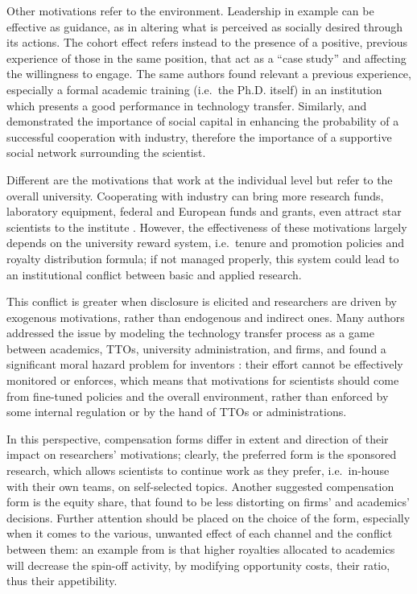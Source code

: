 Other motivations refer to the environment. Leadership in example can be effective as guidance, as in altering what is perceived as socially desired through its actions. The cohort effect \citep{Bercovitz2006} refers instead to the presence of a positive, previous experience of those in the same position, that act as a \enquote{case study} and affecting the willingness to engage. The same authors found relevant a previous experience, especially a formal academic training (i.e.\ the Ph.D. itself) in an institution which presents a good performance in technology transfer. Similarly, \citet{Murray2004} and \citet{Link2007} demonstrated the importance of social capital in enhancing the probability of a successful cooperation with industry, therefore the importance of a supportive social network surrounding the scientist.

Different are the motivations that work at the individual level but refer to the overall university. Cooperating with industry can bring more research funds, laboratory equipment, federal and European funds and grants, even attract star scientists to the institute \citep{OShea2004, Baldini2007, DEste2007}. However, the effectiveness of these motivations largely depends on the university reward system, i.e.\ tenure and promotion policies and royalty distribution formula; if not managed properly, this system could lead to an institutional conflict between basic and applied research. 

This conflict is greater when disclosure is elicited and researchers are driven by exogenous motivations, rather than endogenous and indirect ones. Many authors addressed the issue by modeling the technology transfer process as a game between academics, TTOs, university administration, and firms, and found a significant moral hazard problem for inventors \citep{Jensen1998}: their effort cannot be effectively monitored or enforces, which means that motivations for scientists should come from fine-tuned policies and the overall environment, rather than enforced by some internal regulation or by the hand of TTOs or administrations. 

In this perspective, compensation forms differ in extent and direction of their impact on researchers' motivations; clearly, the preferred form is the sponsored research, which allows scientists to continue work as they prefer, i.e.\ in-house with their own teams, on self-selected topics. Another suggested compensation form is the equity share, that \citet{Jensen1998} found to be less distorting on firms' and academics' decisions. Further attention should be placed on the choice of the form, especially when it comes to the various, unwanted effect of each channel and the conflict between them: an example from \citet{OShea2004} is that higher royalties allocated to academics will decrease the spin-off activity, by modifying opportunity costs, their ratio, thus their appetibility.


